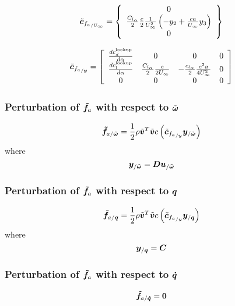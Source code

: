 \begin{equation}
\tilde{\bm{c}}_{{f_{a}}_{/U_{\infty}}} = \left\{
	\begin{array}{c}
		0 \\
		\frac{C_{l_{\alpha}}}{2} \frac{c}{2} \frac{1}{U_\infty^2} 
		\left(  -y_2 + \frac{c a}{U_\infty} y_3 \right) \\
		0
	\end{array} \right\}
\end{equation}

\begin{equation}
\tilde{\bm{c}}_{{f_{a}}_{/\bm{y}}} = \left[
	\begin{array}{cccc}
		\frac{ d c_d^{\text{lookup}}}{d \alpha} & 0 & 0 & 0 \\
		\frac{ d c_l^{\text{lookup}}}{d \alpha} & \frac{C_{l_{\alpha}}}{2} \frac{c}{2 U_\infty}&
			-\frac{c_{l_{\alpha}}}{2} \frac{c^2 a}{4 U_\infty^2} & 0 \\
		0 & 0 & 0 & 0
	\end{array} \right]
\end{equation}

\subsubsection{Perturbation of $\bm{\tilde{f}}_a$ with respect to $\tilde{\bm{\omega}}$}
\begin{equation}
\bm{\tilde{f}}_{a/\tilde{\bm{\omega}}} = 
	\frac{1}{2} \rho \tilde{\bm{v}}^T \tilde{\bm{v}} c
	\left(  \tilde{\bm{c}}_{{f_{a}}_{/\bm{y}}} \bm{y}_{/\tilde{\bm{\omega}}}  \right) 
\end{equation}
where
\begin{equation}
\bm{y}_{/\tilde{\bm{\omega}}} = 
	\bm{D} \bm{u}_{/\tilde{\bm{\omega}}}
\end{equation}
\subsubsection{Perturbation of $\bm{\tilde{f}}_a$ with respect to $\bm{q}$}
\begin{equation}
\bm{\tilde{f}}_{a/\bm{q}} = 
	\frac{1}{2} \rho \tilde{\bm{v}}^T \tilde{\bm{v}} c
	\left(  \tilde{\bm{c}}_{{f_{a}}_{/\bm{y}}} \bm{y}_{/\bm{q}}  \right) 
\end{equation}
where
\begin{equation}
\bm{y}_{/\bm{q}} = \bm{C} 
\end{equation}

\subsubsection{Perturbation of $\bm{\tilde{f}}_a$ with respect to $\bm{\dot{q}}$}
\begin{equation}
\bm{\tilde{f}}_{a/\bm{\dot{q}}} = \bm{0}
\end{equation}

